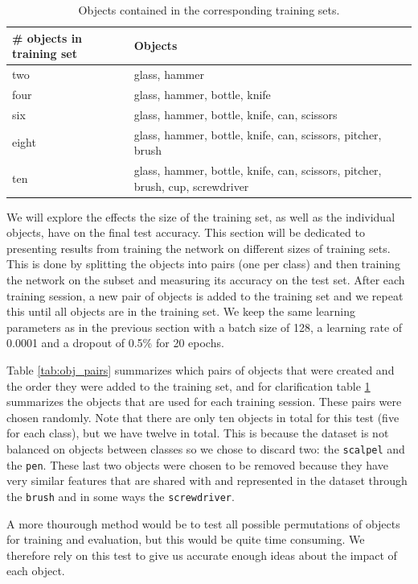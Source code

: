 \begin{table}
	\centering
	\begin{tabular}{l | p{8cm}}
		\hline
		\# objects in training set & Objects \\ \hline
		two   & glass, hammer \\
		four  & glass, hammer, bottle, knife \\
		six   & glass, hammer, bottle, knife, can, scissors \\
		eight & glass, hammer, bottle, knife, can, scissors, pitcher, brush \\
		ten   & glass, hammer, bottle, knife, can, scissors, pitcher, brush, cup, screwdriver \\
		\hline
	\end{tabular}
	\caption{Objects contained in the corresponding training sets.}
	\label{tab:obj_training_sets}
\end{table}

We will explore the effects the size of the training set, as well as the individual objects, have on the final test accuracy. This section will be dedicated to presenting results from training the network on different sizes of training sets. This is done by splitting the objects into pairs (one per class) and then training the network on the subset and measuring its accuracy on the test set. After each training session, a new pair of objects is added to the training set and we repeat this until all objects are in the training set. We keep the same learning parameters as in the previous section with a batch size of 128, a learning rate of 0.0001 and a dropout of 0.5\% for 20 epochs.

Table \ref{tab:obj_pairs} summarizes which pairs of objects that were created and the order they were added to the training set, and for clarification table \ref{tab:obj_training_sets} summarizes the objects that are used for each training session. These pairs were chosen randomly. Note that there are only ten objects in total for this test (five for each class), but we have twelve in total. This is because the dataset is not balanced on objects between classes so we chose to discard two: the \texttt{scalpel} and the \texttt{pen}. These last two objects were chosen to be removed because they have very similar features that are shared with and represented in the dataset through the \texttt{brush} and in some ways the \texttt{screwdriver}.

A more thourough method would be to test all possible permutations of objects for training and evaluation, but this would be quite time consuming. We therefore rely on this test to give us accurate enough ideas about the impact of each object.


